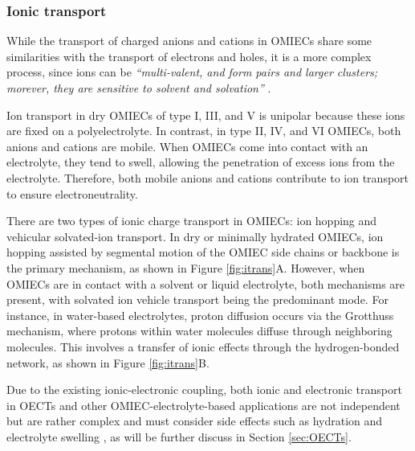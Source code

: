 \subsubsection{Ionic transport}
While the transport of charged anions and cations in OMIECs share some similarities with the transport of electrons and holes, it is a more complex process, since ions can be \textit{``multi-valent, and form pairs and larger clusters; morever, they are sensitive to solvent and solvation''} \cite{paulsenOrganicMixedIonic2020}.

Ion transport in dry OMIECs of type I, III, and V is unipolar because these ions are fixed on a polyelectrolyte. In contrast, in type II, IV, and VI OMIECs, both anions and cations are mobile. When OMIECs come into contact with an electrolyte, they tend to swell, allowing the penetration of excess ions from the electrolyte. Therefore, both mobile anions and cations contribute to ion transport to ensure electroneutrality. 

There are two types of ionic charge transport in OMIECs: ion hopping and vehicular solvated-ion transport. In dry or minimally hydrated OMIECs, ion hopping assisted by segmental motion of the OMIEC side chains or backbone is the primary mechanism, as shown in Figure \ref{fig:itrans}A. However, when OMIECs are in contact with a solvent or liquid electrolyte, both mechanisms are present, with solvated ion vehicle transport being the predominant mode. For instance, in water-based electrolytes, proton diffusion occurs via the Grotthuss mechanism, where protons within water molecules diffuse through neighboring molecules. This involves a transfer of ionic effects through the hydrogen-bonded network, as shown in Figure \ref{fig:itrans}B.

Due to the existing ionic-electronic coupling, both ionic and electronic transport in OECTs and other OMIEC-electrolyte-based applications are not independent but are rather complex and must consider side effects such as hydration and electrolyte swelling \cite{paulsenOrganicMixedIonic2020}, as will be further discuss in Section \ref{sec:OECTs}.

